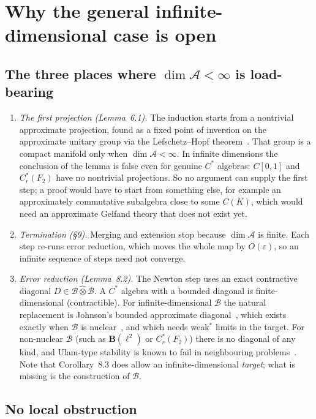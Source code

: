 \documentclass[11pt]{article}
\theoremstyle{remark}
\newcommand{\eps}{\varepsilon}
\newcommand{\cA}{\mathcal{A}}
\newcommand{\cB}{\mathcal{B}}
\newcommand{\Bo}{\mathbf{B}}
\begin{document}
\section{Why the general infinite-dimensional case is open}\label{sec:open}

\subsection{The three places where $\dim\cA<\infty$ is load-bearing}

\begin{enumerate}
\item \emph{The first projection (Lemma~6.1).} The induction starts from a nontrivial approximate projection, found as a fixed point of inversion on the approximate unitary group via the Lefschetz--Hopf theorem~\cite{Hatcher}. That group is a compact manifold only when $\dim\cA<\infty$. In infinite dimensions the conclusion of the lemma is false even for genuine $C^*$ algebras: $C[0,1]$ and $C^*_r(F_2)$ have no nontrivial projections. So no argument can supply the first step; a proof would have to start from something else, for example an approximately commutative subalgebra close to some $C(K)$, which would need an approximate Gelfand theory that does not exist yet.
\item \emph{Termination (\S9).} Merging and extension stop because $\dim\cA$ is finite. Each step re-runs error reduction, which moves the whole map by $O(\eps)$, so an infinite sequence of steps need not converge.
\item \emph{Error reduction (Lemma~8.2).} The Newton step uses an exact contractive diagonal $D\in\cB\hat\otimes\cB$. A $C^*$ algebra with a bounded diagonal is finite-dimensional (contractible). For infinite-dimensional $\cB$ the natural replacement is Johnson's bounded approximate diagonal~\cite{JohnsonMemoir,Johnson72}, which exists exactly when $\cB$ is nuclear~\cite{Connes,Haagerup}, and which needs weak$^*$ limits in the target. For non-nuclear $\cB$ (such as $\Bo(\ell^2)$ or $C^*_r(F_2)$) there is no diagonal of any kind, and Ulam-type stability is known to fail in neighbouring problems~\cite{Kazhdan,BOT}. Note that Corollary~8.3 does allow an infinite-dimensional \emph{target}; what is missing is the construction of $\cB$.
\end{enumerate}

\subsection{No local obstruction}
\end{document}
